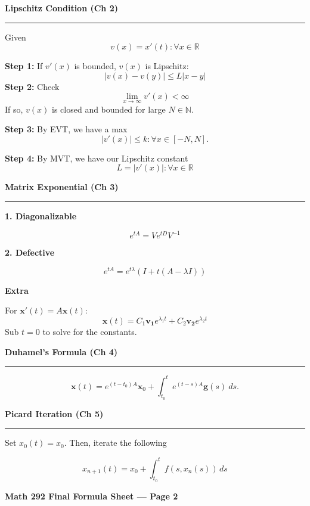 \documentclass[12pt]{article}
\newcommand{\heading}[1]{%
  \vspace{10pt}
  \textbf{#1} \\[-12pt]
  \rule{\linewidth}{0.4pt}
  \par\vspace{2pt}
}
\newcommand{\sub}[1]{\smallskip\textbf{#1}\;}
\newlength{\colw}
\begin{document}
\begin{minipage}[t]{\colw}

    \heading{Lipschitz Condition (Ch 2)}
    Given
    \[ v(x) = x'(t) : \forall x \in \mathbb{R} \]

    \textbf{Step 1:} If $v'(x)$ is bounded, $v(x)$ is Lipschitz:
    \[ |v(x) - v(y)| \le L|x - y| \]
    \textbf{Step 2:} Check
    \[ \lim_{x\rightarrow \infty} v'(x) < \infty \]
    If so, $v(x)$ is closed and bounded for large $N \in \mathbb{N}$.

    \textbf{Step 3:}
    By EVT, we have a max
    \[
        |v'(x)| \leq k : \forall x \in [-N, N].
    \]

    \textbf{Step 4:} By MVT, we have our Lipschitz constant
    \[ L = |v'(x)|  : \forall x \in \mathbb{R} \]

    \heading{Matrix Exponential (Ch 3)}

    \sub{1. Diagonalizable}

    \[ e^{tA} = Ve^{tD}V^{-1} \]

    \sub{2. Defective}

    \[ e^{tA} = e^{t\lambda} (I + t(A - \lambda I)) \]

    \sub{Extra}

    For $\mathbf{x}'(t) = A\mathbf{x}(t)$:
    \[
        \mathbf{x}(t) = C_1\mathbf{v_1}e^{\lambda_1t} + C_2\mathbf{v_2}e^{\lambda_2t}
    \]
    Sub $t = 0$ to solve for the constants.

    \heading{Duhamel's Formula (Ch 4)}

    \begin{equation*}
        \mathbf{x}(t) = e^{(t-t_0)A} \mathbf{x}_0 + \int_{t_0}^{t} e^{(t-s)A} \mathbf{g}(s) ~ ds.
    \end{equation*}

    \heading{Picard Iteration (Ch 5)}
    Set $x_0(t) = x_0$. Then, iterate the following

    \[ x_{n+1}(t) = x_0 + \int_{t_0}^t f(s, x_n(s)) \, ds \]

\end{minipage}

\newpage

\begin{center}
    \textbf{\Large Math 292 Final Formula Sheet --- Page 2}
\end{center}
\end{document}
